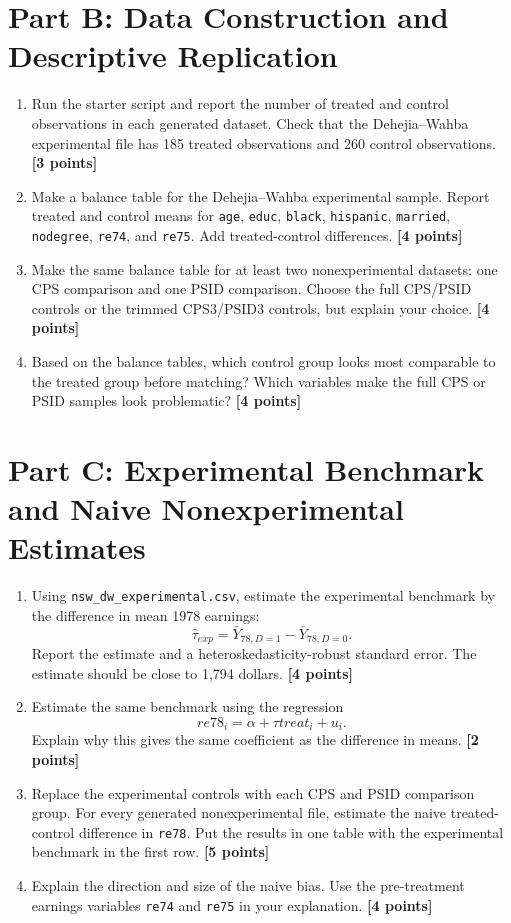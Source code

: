 \documentclass[11pt]{article}
\newcommand{\points}[1]{\hfill \textbf{[#1 points]}}
\begin{document}
\section*{Part B: Data Construction and Descriptive Replication}

\begin{enumerate}[label=B\arabic*.]
  \item Run the starter script and report the number of treated and control observations in each generated dataset. Check that the Dehejia--Wahba experimental file has 185 treated observations and 260 control observations. \points{3}

  \item Make a balance table for the Dehejia--Wahba experimental sample. Report treated and control means for \texttt{age}, \texttt{educ}, \texttt{black}, \texttt{hispanic}, \texttt{married}, \texttt{nodegree}, \texttt{re74}, and \texttt{re75}. Add treated-control differences. \points{4}

  \item Make the same balance table for at least two nonexperimental datasets: one CPS comparison and one PSID comparison. Choose the full CPS/PSID controls or the trimmed CPS3/PSID3 controls, but explain your choice. \points{4}

  \item Based on the balance tables, which control group looks most comparable to the treated group before matching? Which variables make the full CPS or PSID samples look problematic? \points{4}
\end{enumerate}

\section*{Part C: Experimental Benchmark and Naive Nonexperimental Estimates}

\begin{enumerate}[label=C\arabic*.]
  \item Using \texttt{nsw\_dw\_experimental.csv}, estimate the experimental benchmark by the difference in mean 1978 earnings:
  \[
    \widehat{\tau}_{exp}
    =
    \bar{Y}_{78,D=1}
    -
    \bar{Y}_{78,D=0}.
  \]
  Report the estimate and a heteroskedasticity-robust standard error. The estimate should be close to 1,794 dollars. \points{4}

  \item Estimate the same benchmark using the regression
  \[
    re78_i = \alpha + \tau treat_i + u_i.
  \]
  Explain why this gives the same coefficient as the difference in means. \points{2}

  \item Replace the experimental controls with each CPS and PSID comparison group. For every generated nonexperimental file, estimate the naive treated-control difference in \texttt{re78}. Put the results in one table with the experimental benchmark in the first row. \points{5}

  \item Explain the direction and size of the naive bias. Use the pre-treatment earnings variables \texttt{re74} and \texttt{re75} in your explanation. \points{4}
\end{enumerate}
\end{document}
